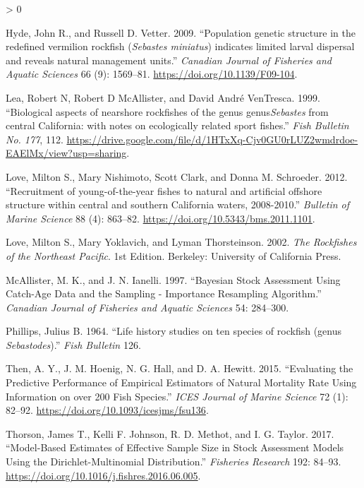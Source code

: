 \documentclass[11pt,
  english,
  a4paper,
]{article}
\newlength{\cslhangindent}
\newenvironment{CSLReferences}[2] %
 {%
  \setlength{\parindent}{0pt}
  \ifodd #1 \everypar{\setlength{\hangindent}{\cslhangindent}}\ignorespaces\fi
  \ifnum #2 > 0
  \setlength{\parskip}{#2\baselineskip}
  \fi
 }%
 {}
\begin{document}
\begin{CSLReferences}{1}{0}
\leavevmode\hypertarget{ref-Hyde2009}{}%
Hyde, John R., and Russell D. Vetter. 2009. {``{Population genetic structure in the redefined vermilion rockfish (\emph{Sebastes miniatus}) indicates limited larval dispersal and reveals natural management units}.''} \emph{Canadian Journal of Fisheries and Aquatic Sciences} 66 (9): 1569--81. \url{https://doi.org/10.1139/F09-104}.

\leavevmode\hypertarget{ref-Lea1999}{}%
Lea, Robert N, Robert D McAllister, and David André VenTresca. 1999. {``{Biological aspects of nearshore rockfishes of the genus genus\emph{Sebastes} from central California: with notes on ecologically related sport fishes}.''} \emph{Fish Bulletin No. 177}, 112. \url{https://drive.google.com/file/d/1HTxXq-Cjv0GU0rLUZ2wmdrdoe-EAElMx/view?usp=sharing}.

\leavevmode\hypertarget{ref-Love2012a}{}%
Love, Milton S., Mary Nishimoto, Scott Clark, and Donna M. Schroeder. 2012. {``{Recruitment of young-of-the-year fishes to natural and artificial offshore structure within central and southern California waters, 2008-2010}.''} \emph{Bulletin of Marine Science} 88 (4): 863--82. \url{https://doi.org/10.5343/bms.2011.1101}.

\leavevmode\hypertarget{ref-love_rockfishes_2002}{}%
Love, Milton S., Mary Yoklavich, and Lyman Thorsteinson. 2002. \emph{The Rockfishes of the Northeast Pacific}. 1st Edition. Berkeley: University of California Press.

\leavevmode\hypertarget{ref-mcallister_bayesian_1997}{}%
McAllister, M. K., and J. N. Ianelli. 1997. {``Bayesian Stock Assessment Using Catch-Age Data and the Sampling - Importance Resampling Algorithm.''} \emph{Canadian Journal of Fisheries and Aquatic Sciences} 54: 284--300.

\leavevmode\hypertarget{ref-Phillips1964}{}%
Phillips, Julius B. 1964. {``{Life history studies on ten species of rockfish (genus \emph{Sebastodes})}.''} \emph{Fish Bulletin} 126.

\leavevmode\hypertarget{ref-then_evaluating_2015-1}{}%
Then, A. Y., J. M. Hoenig, N. G. Hall, and D. A. Hewitt. 2015. {``Evaluating the Predictive Performance of Empirical Estimators of Natural Mortality Rate Using Information on over 200 Fish Species.''} \emph{ICES Journal of Marine Science} 72 (1): 82--92. \url{https://doi.org/10.1093/icesjms/fsu136}.

\leavevmode\hypertarget{ref-thorson_model-based_2017}{}%
Thorson, James T., Kelli F. Johnson, R. D. Methot, and I. G. Taylor. 2017. {``Model-Based Estimates of Effective Sample Size in Stock Assessment Models Using the {Dirichlet}-Multinomial Distribution.''} \emph{Fisheries Research} 192: 84--93. \url{https://doi.org/10.1016/j.fishres.2016.06.005}.

\end{CSLReferences}
\end{document}
